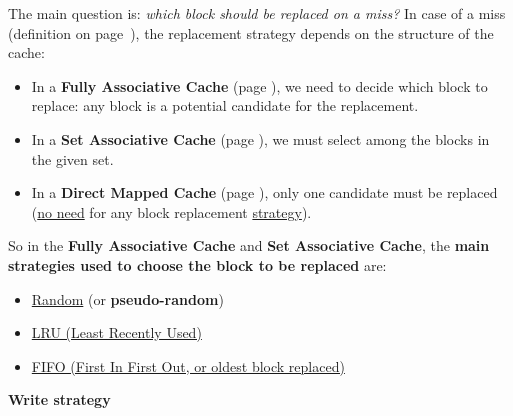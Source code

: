 \noindent
The main question is: \emph{which block should be replaced on a miss?} In case of a miss (definition on page~\pageref{definition: Cache Miss}), the replacement strategy depends on the structure of the cache:
\begin{itemize}
    \item In a \textbf{Fully Associative Cache} (page \pageref{Fully Associative Cache}), we need to decide which block to replace: any block is a potential candidate for the replacement.

    \item In a \textbf{Set Associative Cache} (page \pageref{n-way Set Associative Cache}), we must select among the blocks in the given set.
    
    \item In a \textbf{Direct Mapped Cache} (page \pageref{Direct Mapped Cache}), only one candidate must be replaced (\underline{no need} for any block replacement \underline{strategy}).
\end{itemize}
So in the \textbf{Fully Associative Cache} and \textbf{Set Associative Cache}, the \textbf{main strategies used to choose the block to be replaced} are:
\begin{itemize}
    \item \href{https://en.wikipedia.org/wiki/Cache_replacement_policies#Random_replacement_(RR)}{Random} (or \textbf{pseudo-random})
    
    \item \href{https://en.wikipedia.org/wiki/Cache_replacement_policies#Least_recently_used_(LRU)}{LRU (Least Recently Used)}

    \item \href{https://en.wikipedia.org/wiki/Cache_replacement_policies#First_in_first_out_(FIFO)}{FIFO (First In First Out, or oldest block replaced)}
\end{itemize}

\newpage

\begin{center}
    \large
    \label{Write strategy}
    \hypertarget{Write strategy}{\textcolor{Red2}{\textbf{Write strategy}}}
\end{center}

